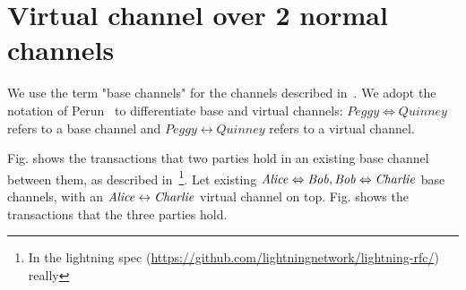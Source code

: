 \section{Virtual channel over 2 normal channels}
  We use the term "base channels" for the channels described
  in~\cite{lightning}. We adopt the notation of
  Perun~\cite{DBLP:conf/ccs/DziembowskiFH18} to differentiate base and virtual
  channels: $\mathit{Peggy} \Leftrightarrow \mathit{Quinney}$ refers to a base
  channel and $\mathit{Peggy} \leftrightarrow \mathit{Quinney}$ refers to a
  virtual channel.

  Fig. shows the transactions that two parties hold in an
  existing base channel between them, as described
  in~\cite{lightning}\footnote{In the lightning spec
  (\url{https://github.com/lightningnetwork/lightning-rfc/}) really}. Let
  existing $\mathit{Alice} \Leftrightarrow \mathit{Bob}, \mathit{Bob} \Leftrightarrow \mathit{Charlie}$ base
  channels, with an $\mathit{Alice} \leftrightarrow \mathit{Charlie}$ virtual channel on top.
  Fig. shows the transactions that the three parties hold.

%    

